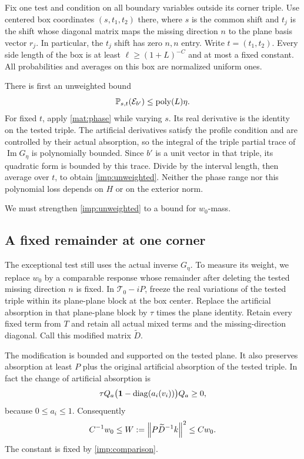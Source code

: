 Fix one test and condition on all boundary variables outside its corner
triple. Use centered box coordinates $(s,t_1,t_2)$ there, where $s$ is the
common shift and $t_j$ is the shift whose diagonal matrix maps the missing
direction $n$ to the plane basis vector $r_j$. In particular, the $t_j$
shift has zero $n,n$ entry. Write $t=(t_1,t_2)$. Every side length of the
box is at least $\ell\ge(1+L)^{-C}$ and at most a fixed constant. All
probabilities and averages on this box are normalized uniform ones.

There is first an unweighted bound
\begin{equation}
 \mathbb P_{s,t}(\mathcal E_{b'})\le\operatorname{poly}(L)\eta.
 \label{imp:unweighted}
\end{equation}
For fixed $t$, apply \cref{mat:phase} while varying $s$. Its real
derivative is the identity on the tested triple. The artificial
derivatives satisfy the profile condition and are controlled by their
actual absorption, so the integral of the triple partial trace of
$\operatorname{Im}G_\eta$ is polynomially bounded. Since $b'$ is a unit
vector in that triple, its quadratic form is bounded by this trace.
Divide by the interval length, then average over $t$, to obtain
\cref{imp:unweighted}. Neither the phase range nor this polynomial loss
depends on $H$ or on the exterior norm.

We must strengthen \cref{imp:unweighted} to a bound for $w_0$-mass.

\subsection{A fixed remainder at one corner}

The exceptional test still uses the actual inverse $G_\eta$. To measure
its weight, we replace $w_0$ by a comparable response whose remainder
after deleting the tested missing direction $n$ is fixed. In
$\mathcal T_0-iP$, freeze the real variations of the tested triple
within its plane-plane block at the box center. Replace the artificial
absorption in that plane-plane block by $\tau$ times the plane identity.
Retain every fixed term from $T$ and retain all actual mixed terms and
the missing-direction diagonal. Call this modified matrix
$\widetilde D$.

The modification is bounded and supported on the tested plane. It also
preserves absorption at least $P$ plus the original artificial absorption
of the tested triple. In fact the change of artificial absorption is
\[
 \tau Q_a\bigl(\mathbf 1-\operatorname{diag}(a_i(v_i))\bigr)Q_a\ge0,
\]
because $0\le a_i\le1$. Consequently
\begin{equation}
 C^{-1}w_0\le W:=\left\lVert P\widetilde D^{-1}k\right\rVert^2\le Cw_0.
 \label{imp:modified-weight}
\end{equation}
The constant is fixed by \cref{imp:comparison}.

